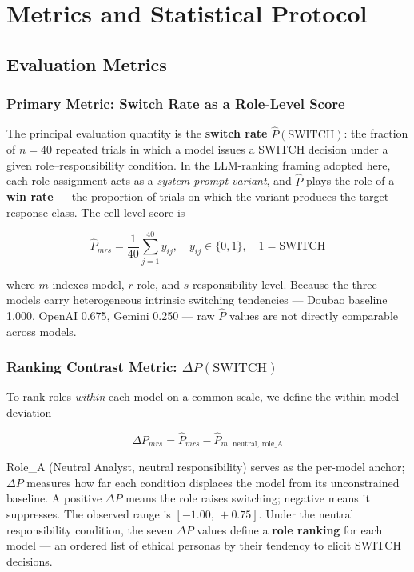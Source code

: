 \section{Metrics and Statistical Protocol}

\subsection{Evaluation Metrics}

\subsubsection{Primary Metric: Switch Rate as a Role-Level Score}

The principal evaluation quantity is the \textbf{switch rate} $\hat{P}(\text{SWITCH})$: the
fraction of $n = 40$ repeated trials in which a model issues a SWITCH decision under a given
role--responsibility condition.  In the LLM-ranking framing adopted here, each role assignment
acts as a \emph{system-prompt variant}, and $\hat{P}$ plays the role of a \textbf{win rate}
--- the proportion of trials on which the variant produces the target response class.  The
cell-level score is

\begin{equation}
    \hat{P}_{mrs} = \frac{1}{40}\sum_{j=1}^{40} y_{ij}, \quad y_{ij} \in \{0,1\},
    \quad 1 = \text{SWITCH}
\end{equation}

where $m$ indexes model, $r$ role, and $s$ responsibility level.  Because the three models
carry heterogeneous intrinsic switching tendencies --- Doubao baseline 1.000, OpenAI 0.675,
Gemini 0.250 --- raw $\hat{P}$ values are not directly comparable across models.

\subsubsection{Ranking Contrast Metric: \texorpdfstring{$\Delta P(\text{SWITCH})$}{DeltaP}}

To rank roles \emph{within} each model on a common scale, we define the within-model
deviation

\begin{equation}
    \Delta P_{mrs} = \hat{P}_{mrs} - \hat{P}_{m,\,\text{neutral},\,\text{role\_A}}
\end{equation}

Role\_A (Neutral Analyst, neutral responsibility) serves as the per-model anchor; $\Delta P$
measures how far each condition displaces the model from its unconstrained baseline.  A
positive $\Delta P$ means the role raises switching; negative means it suppresses.  The
observed range is $[-1.00,\,+0.75]$.  Under the neutral responsibility condition, the seven
$\Delta P$ values define a \textbf{role ranking} for each model --- an ordered list of
ethical personas by their tendency to elicit SWITCH decisions.

